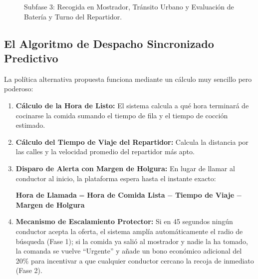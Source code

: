 \documentclass[11pt,a4paper]{article}
\begin{document}
\begin{figure}[htbp]
{%
}
\caption{Subfase 3: Recogida en Mostrador, Tránsito Urbano y Evaluación de Batería y Turno del Repartidor.}
\label{fig:subfase3}
\end{figure}

\subsection{El Algoritmo de Despacho Sincronizado Predictivo}
La política alternativa propuesta funciona mediante un cálculo muy sencillo pero poderoso:
\begin{enumerate}
    \item \textbf{Cálculo de la Hora de Listo:} El sistema calcula a qué hora terminará de cocinarse la comida sumando el tiempo de fila y el tiempo de cocción estimado.
    \item \textbf{Cálculo del Tiempo de Viaje del Repartidor:} Calcula la distancia por las calles y la velocidad promedio del repartidor más apto.
    \item \textbf{Disparo de Alerta con Margen de Holgura:} En lugar de llamar al conductor al inicio, la plataforma espera hasta el instante exacto:
    \begin{center}
        \textbf{Hora de Llamada} = \textbf{Hora de Comida Lista} $-$ \textbf{Tiempo de Viaje} $-$ \textbf{Margen de Holgura}
    \end{center}
    \item \textbf{Mecanismo de Escalamiento Protector:} Si en 45 segundos ningún conductor acepta la oferta, el sistema amplía automáticamente el radio de búsqueda (Fase 1); si la comida ya salió al mostrador y nadie la ha tomado, la comanda se vuelve ``Urgente'' y añade un bono económico adicional del 20\% para incentivar a que cualquier conductor cercano la recoja de inmediato (Fase 2).
\end{enumerate}
\end{document}
